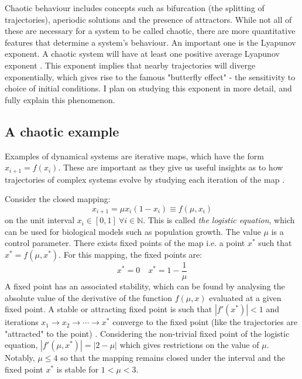 \documentclass[12pt,a4paper]{amsart}
\begin{document}

Chaotic behaviour includes concepts such as bifurcation (the splitting of trajectories), aperiodic solutions and the presence of attractors. While not all of these are necessary for a system to be called chaotic, there are more quantitative features that determine a system's behaviour. An important one is the Lyapunov exponent. A chaotic system will have at least one positive average Lyapunov exponent \cite{HILBORN}. This exponent implies that nearby trajectories will diverge exponentially, which gives rise to the famous "butterfly effect" - the sensitivity to choice of initial conditions. I plan on studying this exponent in more detail, and fully explain this phenomenon.

\subsection{A chaotic example}

Examples of dynamical systems are iterative maps, which have the form $x_{i+1} = f(x_{i})$. These are important as they give us useful insights as to how trajectories of complex systems evolve by studying each iteration of the map \cite{HILBORN}.

Consider the closed mapping: $$x_{i+1} = {\mu} x_{i} (1 - x_{i}) \equiv f(\mu, x_{i}) \label{mapping}$$ on the unit interval $x_{i} \in [0, 1] \  {\forall}i \in \mathbb{N}$. This is called \textit{the logistic equation}, which can be used for biological models such as population growth. The value $\mu$ is a control parameter. There exists fixed points of the map i.e. a point $x^{*}$ such that $x^{*} = f(\mu, x^{*})$. For this mapping, the fixed points are: $$x^{*} = 0 \quad x^{*} = 1 - \frac{1}{\mu}$$ A fixed point has an associated stability, which can be found by analysing the absolute value of the derivative of the function $f(\mu, x)$ evaluated at a given fixed point. A stable or attracting fixed point is such that $|f'(x^{*})| < 1$ and iterations $x_{1} \rightarrow x_{2} \rightarrow \cdots \rightarrow x^{*}$ converge to the fixed point (like the trajectories are "attracted" to the point) \cite{SCHECK}. Considering the non-trivial fixed point of the logistic equation, $|f'(\mu, x^{*})| = |2 - \mu|$ which gives restrictions on the value of $\mu$. Notably, $\mu \leq 4$ so that the mapping remains closed under the interval and the fixed point $x^{*}$ is stable for $1 < \mu < 3$. 
\end{document}
